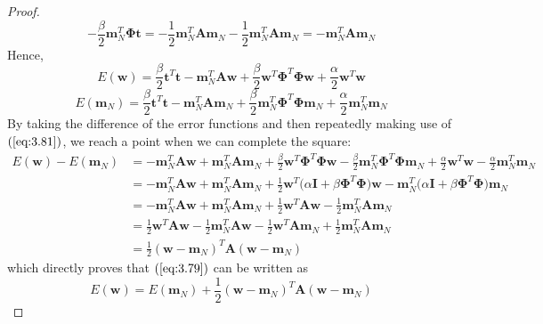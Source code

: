\begin{proof}
\[            - \frac{\beta}{2} \mathbf{m}_N^T\mathbf{\Phi}\mathbf{t}
        =  
        -\frac{1}{2} \mathbf{m}_N^T\mathbf{A}\mathbf{m}_N
            -\frac{1}{2} \mathbf{m}_N^T\mathbf{A}\mathbf{m}_N
        = 
        -\mathbf{m}_N^T\mathbf{A}\mathbf{m}_N
    \] 
    Hence, 
    \[
        E(\mathbf{w})
        = \frac{\beta}{2} \mathbf{t}^T\mathbf{t} 
            -\mathbf{m}_N^T\mathbf{A}\mathbf{w}
            + \frac{\beta}{2} \mathbf{w}^T\mathbf{\Phi}^T\mathbf{\Phi}\mathbf{w}
            + \frac{\alpha}{2} \mathbf{w}^T\mathbf{w}
    \] 
    \[
        E(\mathbf{m}_N)
        = \frac{\beta}{2} \mathbf{t}^T\mathbf{t} 
            -\mathbf{m}_N^T\mathbf{A}\mathbf{m}_N
            + \frac{\beta}{2} \mathbf{m}_N^T\mathbf{\Phi}^T\mathbf{\Phi}\mathbf{m}_N
            + \frac{\alpha}{2} \mathbf{m}_N^T\mathbf{m}_N
    \]
    By taking the difference of the error functions and then
    repeatedly making use of $(\ref{eq:3.81})$, we reach a point
    when we can complete the square:
    \begin{align*}
        E(\mathbf{w}) - E(\mathbf{m}_N)
        &= -\mathbf{m}_N^T\mathbf{A}\mathbf{w} 
            + \mathbf{m}_N^T\mathbf{A}\mathbf{m}_N
            + \frac{\beta}{2} \mathbf{w}^T\mathbf{\Phi}^T\mathbf{\Phi}\mathbf{w}
            - \frac{\beta}{2} \mathbf{m}_N^T\mathbf{\Phi}^T\mathbf{\Phi}\mathbf{m}_N
            + \frac{\alpha}{2} \mathbf{w}^T\mathbf{w} 
            - \frac{\alpha}{2} \mathbf{m}_N^T\mathbf{m}_N \\
        &= -\mathbf{m}_N^T\mathbf{A}\mathbf{w} 
            + \mathbf{m}_N^T\mathbf{A}\mathbf{m}_N
            + \frac{1}{2} \mathbf{w}^T\big(
                \alpha \mathbf{I} + \beta \mathbf{\Phi}^T\mathbf{\Phi}\big) 
                \mathbf{w}
            - \mathbf{m}_N^T\big( 
                \alpha \mathbf{I} + \beta \mathbf{\Phi}^T\mathbf{\Phi}\big) 
                \mathbf{m}_N \\
        &= -\mathbf{m}_N^T\mathbf{A}\mathbf{w} 
            + \mathbf{m}_N^T\mathbf{A}\mathbf{m}_N
            + \frac{1}{2} \mathbf{w}^T\mathbf{A}\mathbf{w}
            - \frac{1}{2} \mathbf{m}_N^T\mathbf{A}\mathbf{m}_N \\
        &= \frac{1}{2} \mathbf{w}^T\mathbf{A}\mathbf{w}
            -\frac{1}{2} \mathbf{m}_N^T \mathbf{A}\mathbf{w}
            -\frac{1}{2} \mathbf{w}^T\mathbf{A}\mathbf{m}_N
            + \frac{1}{2} \mathbf{m}_N^T\mathbf{A}\mathbf{m}_N \\
        &= \frac{1}{2} (\mathbf{w} - \mathbf{m}_N)^T\mathbf{A}(\mathbf{w} - \mathbf{m}_N)
    \end{align*}
    which directly proves that $(\ref{eq:3.79})$ can be written as
    \begin{equation}\label{eq:3.80}\tag{3.80}
        E(\mathbf{w}) = E(\mathbf{m}_N) + 
            \frac{1}{2} (\mathbf{w} - \mathbf{m}_N)^T\mathbf{A}(\mathbf{w} - \mathbf{m}_N)
    \end{equation}
\end{proof}

